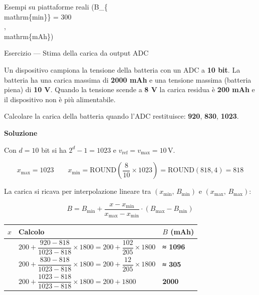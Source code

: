 \documentclass[
  italian,
  openany]{book}
\newcounter{none} %
\begin{document}
\begin{callouttip}{Esempi su piattaforme reali (B\_\{\\mathrm\{min\}\} = 300\\,\\mathrm\{mAh\})}
\end{callouttip}

\begin{callouttip}{Esercizio — Stima della carica da output ADC}

Un dispositivo campiona la tensione della batteria con un ADC a
\textbf{10 bit}. La batteria ha una carica massima di \textbf{2000 mAh}
e una tensione massima (batteria piena) di \textbf{10 V}. Quando la
tensione scende a \textbf{8 V} la carica residua è \textbf{200 mAh} e il
dispositivo non è più alimentabile.

Calcolare la carica della batteria quando l'ADC restituisce:
\textbf{920}, \textbf{830}, \textbf{1023}.

\textbf{Soluzione}

Con \(d = 10\) bit si ha \(2^d - 1 = 1023\) e
\(v_{\mathrm{ref}} = v_{\mathrm{max}} = 10\,\mathrm{V}\).

\[x_{\mathrm{max}} = 1023 \qquad x_{\mathrm{min}} = \mathrm{ROUND}\!\left(\frac{8}{10} \times 1023\right) = \mathrm{ROUND}(818{,}4) = 818\]

La carica si ricava per interpolazione lineare tra
\((x_{\mathrm{min}},\, B_{\mathrm{min}})\) e
\((x_{\mathrm{max}},\, B_{\mathrm{max}})\):

\[B = B_{\mathrm{min}} + \frac{x - x_{\mathrm{min}}}{x_{\mathrm{max}} - x_{\mathrm{min}}} \cdot (B_{\mathrm{max}} - B_{\mathrm{min}})\]

{\def\LTcaptype{none} %
\begin{longtable}[]{@{}
  >{\raggedright\arraybackslash}p{}
  >{\raggedright\arraybackslash}p{}
  >{\raggedright\arraybackslash}p{}@{}}
\toprule\noalign{}
\begin{minipage}[b]{\linewidth}\raggedright
\(x\)
\end{minipage} & \begin{minipage}[b]{\linewidth}\raggedright
Calcolo
\end{minipage} & \begin{minipage}[b]{\linewidth}\raggedright
\(B\) (mAh)
\end{minipage} \\
\midrule\noalign{}
\endhead
\bottomrule\noalign{}
\endlastfoot
920 &
\(200 + \dfrac{920 - 818}{1023 - 818} \times 1800 = 200 + \dfrac{102}{205} \times 1800\)
& \textbf{≈ 1096} \\
830 &
\(200 + \dfrac{830 - 818}{1023 - 818} \times 1800 = 200 + \dfrac{12}{205} \times 1800\)
& \textbf{≈ 305} \\
1023 & \(200 + \dfrac{1023 - 818}{1023 - 818} \times 1800 = 200 + 1800\)
& \textbf{2000} \\
\end{longtable}
}

\end{callouttip}
\end{document}
